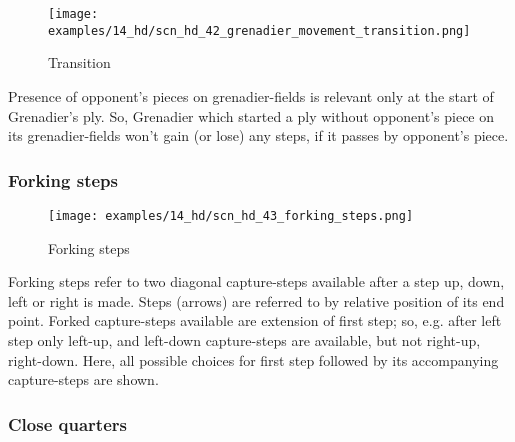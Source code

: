 
\vspace*{-0.7\baselineskip}
\noindent
\begin{wrapfigure}[6]{l}{0.4\textwidth}
\centering
\texttt{[image: examples/14\_hd/scn\_hd\_42\_grenadier\_movement\_transition.png]}
\vspace*{-0.5\baselineskip}
\caption{Transition}
\label{fig:scn_hd_42_grenadier_movement_transition}
\end{wrapfigure}
Presence of opponent's pieces on grenadier-fields is relevant only at the start of
Grenadier's ply.\newline
\indent
So, Grenadier which started a ply without opponent's piece on its grenadier-fields
won't gain (or lose) any steps, if it passes by opponent's piece.

\vspace*{-1.3\baselineskip}
\subsubsection*{Forking steps}
\label{sec:Hemera's Dawn/Grenadier/Movement/Forking steps}

\vspace*{-0.7\baselineskip}
\noindent
\begin{wrapfigure}[11]{l}{0.4\textwidth}
\centering
\texttt{[image: examples/14\_hd/scn\_hd\_43\_forking\_steps.png]}
\vspace*{-0.5\baselineskip}
\caption{Forking steps}
\label{fig:scn_hd_43_forking_steps}
\end{wrapfigure}
Forking steps refer to two diagonal capture-steps available after a step up, down,
left or right is made.\newline
\indent
Steps (arrows) are referred to by relative position of its end point.\newline
\indent
Forked capture-steps available are extension of first step; so, e.g. after left
step only left-up, and left-down capture-steps are available, but not right-up,
right-down.\newline
\indent
Here, all possible choices for first step followed by its accompanying
capture-steps are shown.

\clearpage %

\subsubsection*{Close quarters}
\label{sec:Hemera's Dawn/Grenadier/Movement/Close quarters}

